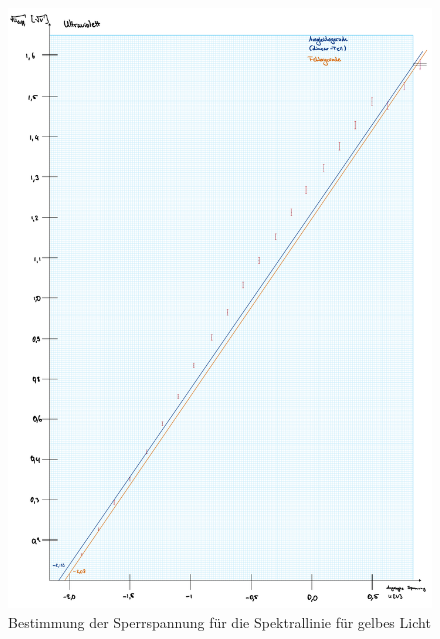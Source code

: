 \begin{figure}[t!]
    \includegraphics[width=1\textwidth, page=5]{img/35/v35-Farbplots.pdf}
    \caption{Bestimmung der Sperrspannung für die Spektrallinie für gelbes Licht}
    \label{fig:gl}
\end{figure}

\newpage


